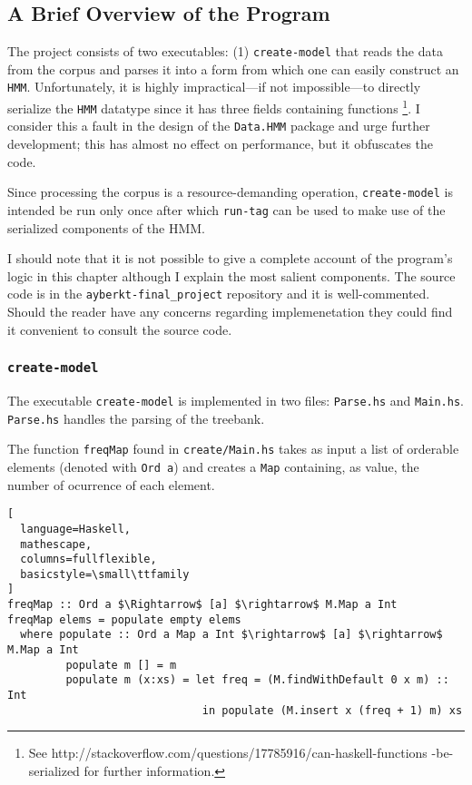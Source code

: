\documentclass{article}
\begin{document}
\subsection{A Brief Overview of the Program}

The project consists of two executables: (1) \texttt{create-model} that reads
the data from the corpus and parses it into a form from which one can easily
construct an \texttt{HMM}. Unfortunately, it is highly impractical---if not
impossible---to directly serialize the \texttt{HMM} datatype since it has three
fields containing functions \footnote{See
  http://stackoverflow.com/questions/17785916/can-haskell-functions
  -be-serialized for further information.}. I consider this a fault in the
design of the \texttt{Data.HMM} package and urge further development; this has
almost no effect on performance, but it obfuscates the code.

Since processing the corpus is a resource-demanding operation,
\texttt{create-model} is intended be run only once after which \texttt{run-tag}
can be used to make use of the serialized components of the HMM.

I should note that it is not possible to give a complete account of the
program's logic in this chapter although I explain the most salient components.
The source code is in the \texttt{ayberkt-final\_project} repository and it is
well-commented. Should the reader have any concerns regarding implemenetation
they could find it convenient to consult the source code.

\subsubsection{\texttt{create-model}}

The executable \texttt{create-model} is implemented in two files:
\texttt{Parse.hs} and \texttt{Main.hs}. \texttt{Parse.hs} handles the parsing of
the treebank.

The function \texttt{freqMap} found in \texttt{create/Main.hs} takes as input a
list of orderable elements (denoted with \texttt{Ord a}) and creates a
\texttt{Map} containing, as value, the number of ocurrence of each element.

\begin{lstlisting}[
  language=Haskell,
  mathescape,
  columns=fullflexible,
  basicstyle=\small\ttfamily
]
freqMap :: Ord a $\Rightarrow$ [a] $\rightarrow$ M.Map a Int
freqMap elems = populate empty elems
  where populate :: Ord a Map a Int $\rightarrow$ [a] $\rightarrow$ M.Map a Int
         populate m [] = m
         populate m (x:xs) = let freq = (M.findWithDefault 0 x m) :: Int
                              in populate (M.insert x (freq + 1) m) xs
\end{lstlisting}
\end{document}

